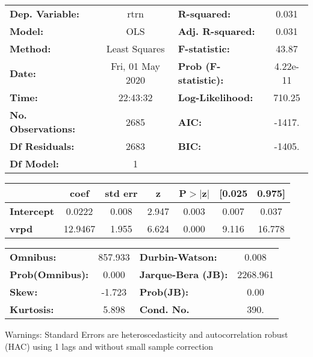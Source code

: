 \begin{center}
\begin{tabular}{lclc}
\toprule
\textbf{Dep. Variable:}    &       rtrn       & \textbf{  R-squared:         } &     0.031   \\
\textbf{Model:}            &       OLS        & \textbf{  Adj. R-squared:    } &     0.031   \\
\textbf{Method:}           &  Least Squares   & \textbf{  F-statistic:       } &     43.87   \\
\textbf{Date:}             & Fri, 01 May 2020 & \textbf{  Prob (F-statistic):} &  4.22e-11   \\
\textbf{Time:}             &     22:43:32     & \textbf{  Log-Likelihood:    } &    710.25   \\
\textbf{No. Observations:} &        2685      & \textbf{  AIC:               } &    -1417.   \\
\textbf{Df Residuals:}     &        2683      & \textbf{  BIC:               } &    -1405.   \\
\textbf{Df Model:}         &           1      & \textbf{                     } &             \\
\bottomrule
\end{tabular}
\begin{tabular}{lcccccc}
                   & \textbf{coef} & \textbf{std err} & \textbf{z} & \textbf{P$> |$z$|$} & \textbf{[0.025} & \textbf{0.975]}  \\
\midrule
\textbf{Intercept} &       0.0222  &        0.008     &     2.947  &         0.003        &        0.007    &        0.037     \\
\textbf{vrpd}      &      12.9467  &        1.955     &     6.624  &         0.000        &        9.116    &       16.778     \\
\bottomrule
\end{tabular}
\begin{tabular}{lclc}
\textbf{Omnibus:}       & 857.933 & \textbf{  Durbin-Watson:     } &    0.008  \\
\textbf{Prob(Omnibus):} &   0.000 & \textbf{  Jarque-Bera (JB):  } & 2268.961  \\
\textbf{Skew:}          &  -1.723 & \textbf{  Prob(JB):          } &     0.00  \\
\textbf{Kurtosis:}      &   5.898 & \textbf{  Cond. No.          } &     390.  \\
\bottomrule
\end{tabular}
\end{center}

Warnings: \newline
 [1] Standard Errors are heteroscedasticity and autocorrelation robust (HAC) using 1 lags and without small sample correction